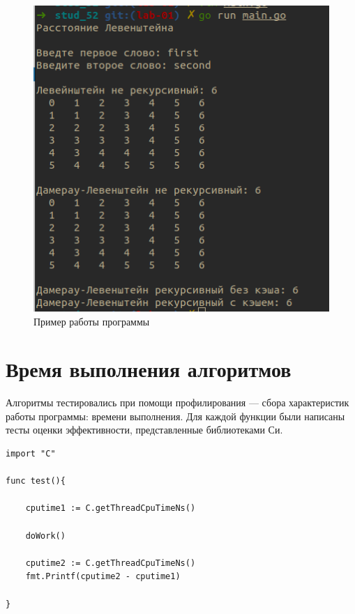 \begin{figure}[ht!]
	\begin{center}
		\includegraphics[]{assets/demonst.png}
	\end{center}
	
	\caption{Пример работы программы}
	\label{demonstration}
\end{figure}

\newpage

\section{Время выполнения алгоритмов}

Алгоритмы тестировались при помощи профилирования --- сбора характеристик работы программы: времени выполнения. Для каждой функции были написаны тесты оценки эффективности, представленные библиотеками Си.

\newpage

\begin{lstlisting}[label=bench,caption=Пример теста эффективности]
import "C"	

func test(){
	
	cputime1 := C.getThreadCpuTimeNs()
	
	doWork()
	
	cputime2 := C.getThreadCpuTimeNs()
	fmt.Printf(cputime2 - cputime1)
	
}
\end{lstlisting}

